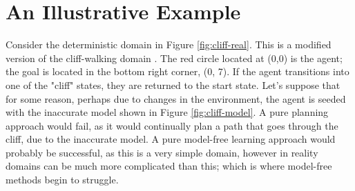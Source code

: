 \section{An Illustrative Example}
Consider the deterministic domain in Figure \ref{fig:cliff-real}. This is a modified version of the cliff-walking domain \cite{Sutton1998}. The red circle located at (0,0) is the agent; the goal is located in the bottom right corner, (0, 7). If the agent transitions into one of the "cliff" states, they are returned to the start state. Let's suppose that for some reason, perhaps due to changes in the environment, the agent is seeded with the inaccurate model shown in Figure \ref{fig:cliff-model}. A pure planning approach would fail, as it would continually plan a path that goes through the cliff, due to the inaccurate model. A pure model-free learning approach would probably be successful, as this is a very simple domain, however in reality domains can be much more complicated than this; which is where model-free methods begin to struggle.




